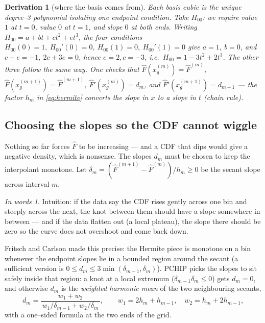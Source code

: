 \documentclass[11pt]{article}
\newcommand{\Fhat}{\widehat{F}}
\newtheorem*{deriv}{Derivation}
\theoremstyle{remark}
\newtheorem*{plain}{In words}
\begin{document}
\begin{deriv}[where the basis comes from]
Each basis cubic is the unique degree--3 polynomial isolating one endpoint
condition. Take $H_{00}$: we require value $1$ at $t=0$, value $0$ at $t=1$, and
slope $0$ at both ends. Writing $H_{00}=a+bt+ct^2+et^3$, the four conditions
$H_{00}(0)=1,\ H_{00}'(0)=0,\ H_{00}(1)=0,\ H_{00}'(1)=0$ give $a=1,\ b=0$, and
$c+e=-1,\ 2c+3e=0$, hence $e=2,c=-3$, i.e.\ $H_{00}=1-3t^2+2t^3$. The other three
follow the same way. One checks that
$\Fhat(x_g^{(m)})=\Fhat^{(m)}$, $\Fhat(x_g^{(m+1)})=\Fhat^{(m+1)}$,
$\Fhat'(x_g^{(m)})=d_m$, and $\Fhat'(x_g^{(m+1)})=d_{m+1}$ --- the factor $h_m$ in
\eqref{eq:hermite} converts the slope in $x$ to a slope in $t$ (chain rule).
\end{deriv}

\subsection{Choosing the slopes so the CDF cannot wiggle}

Nothing so far forces $\Fhat$ to be increasing --- and a CDF that dips would give
a negative density, which is nonsense. The slopes $d_m$ must be chosen to keep the
interpolant monotone. Let $\delta_m=(\Fhat^{(m+1)}-\Fhat^{(m)})/h_m\ge0$ be the
secant slope across interval $m$.

\begin{plain}
Intuition: if the data say the CDF rises gently across one bin and steeply across
the next, the knot between them should have a slope somewhere in between --- and
if the data flatten out (a local plateau), the slope there should be zero so the
curve does not overshoot and come back down.
\end{plain}

Fritsch and Carlson \cite{FritschCarlson1980} made this precise: the Hermite
piece is monotone on a bin whenever the endpoint slopes lie in a bounded region
around the secant (a sufficient version is $0\le d_m\le 3\min(\delta_{m-1},
\delta_m)$). PCHIP picks the slopes to sit safely inside that region: a knot at a
local extremum ($\delta_{m-1}\delta_m\le0$) gets $d_m=0$, and otherwise $d_m$ is
the \emph{weighted harmonic mean} of the two neighbouring secants,
\begin{equation}
\label{eq:fc}
d_m=\frac{w_1+w_2}{\,w_1/\delta_{m-1}+w_2/\delta_m\,},
\qquad w_1=2h_m+h_{m-1},\quad w_2=h_m+2h_{m-1},
\end{equation}
with a one--sided formula at the two ends of the grid.
\end{document}
